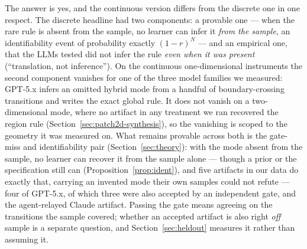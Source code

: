 \documentclass[11pt]{article}
\theoremstyle{definition}
\theoremstyle{remark}
\begin{document}
The answer is yes, and the continuous version differs from the discrete one in one respect. The discrete headline had two components: a provable one --- when the rare rule is absent from the sample, no learner can infer it \emph{from the sample}, an identifiability event of probability exactly $(1-r)^N$ --- and an empirical one, that the LLMs tested did not infer the rule \emph{even when it was present} (``translation, not inference''). On the continuous one-dimensional instruments the second component vanishes for one of the three model families we measured: GPT-5.x infers an omitted hybrid mode from a handful of boundary-crossing transitions and writes the exact global rule. It does not vanish on a two-dimensional mode, where no artifact in any treatment we ran recovered the region rule (Section~\ref{sec:patch2d-synthesis}), so the vanishing is scoped to the geometry it was measured on. What remains provable across both is the gate-miss and identifiability pair (Section~\ref{sec:theory}): with the mode absent from the sample, no learner can recover it from the sample alone --- though a prior or the specification still can (Proposition~\ref{prop:ident}), and five artifacts in our data do exactly that, carrying an invented mode their own samples could not refute --- four of GPT-5.x, of which three were also accepted by an independent gate, and the agent-relayed Claude artifact. Passing the gate means agreeing on the transitions the sample covered; whether an accepted artifact is also right \emph{off} sample is a separate question, and Section~\ref{sec:heldout} measures it rather than assuming it.
\end{document}
